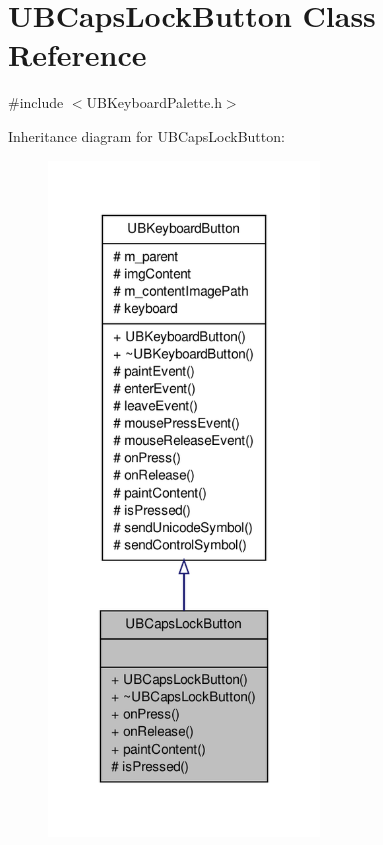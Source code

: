 \hypertarget{class_u_b_caps_lock_button}{\section{U\-B\-Caps\-Lock\-Button Class Reference}
\label{d6/dab/class_u_b_caps_lock_button}
}


{\ttfamily \#include $<$U\-B\-Keyboard\-Palette.\-h$>$}



Inheritance diagram for U\-B\-Caps\-Lock\-Button\-:
\nopagebreak
\begin{figure}[H]
\begin{center}
\leavevmode
\includegraphics[width=204pt]{d7/d89/class_u_b_caps_lock_button__inherit__graph}
\end{center}
\end{figure}


